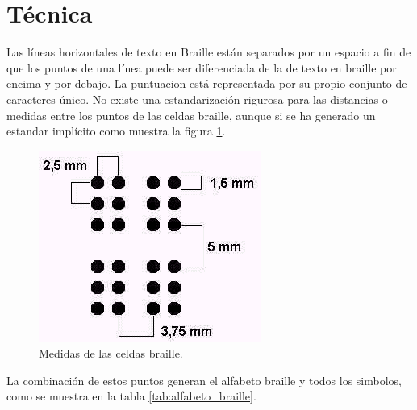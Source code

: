 \section{T\'ecnica}
%
Las l\'ineas horizontales de texto en Braille est\'an separados por un espacio
a fin de que los puntos de una l\'inea puede ser diferenciada de la de texto
en braille por encima y por debajo. La puntuacion est\'a representada por su
propio conjunto de caracteres \'unico. No existe una estandarizaci\'on
rigurosa para las distancias o medidas entre los puntos de las celdas braille,
aunque si se ha generado un estandar impl\'icito como muestra la figura
\ref{fig:distance_dots_braille}.


\begin{figure}[htp]
\centering
\includegraphics[scale=0.6]{./img/distance_dots_braille.png}
\caption{Medidas de las celdas braille.}
\label{fig:distance_dots_braille}
\end{figure}

La combinaci\'on de estos puntos generan el alfabeto braille y todos los
simbolos, como se muestra en la tabla \ref{tab:alfabeto_braille}.

